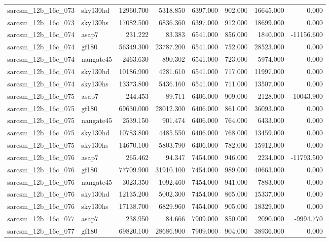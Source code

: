\begin{tabular}{llrrrrrr}
sarcsm\_12b\_16c\_073 & sky130hd & 12960.700 & 5318.850 & 6397.000 & 902.000 & 16645.000 & 0.000 \\
sarcsm\_12b\_16c\_073 & sky130hs & 17082.500 & 6836.360 & 6397.000 & 912.000 & 18699.000 & 0.000 \\
sarcsm\_12b\_16c\_074 & asap7 & 231.222 & 83.383 & 6541.000 & 856.000 & 1840.000 & -11156.600 \\
sarcsm\_12b\_16c\_074 & gf180 & 56349.300 & 23787.200 & 6541.000 & 752.000 & 28523.000 & 0.000 \\
sarcsm\_12b\_16c\_074 & nangate45 & 2463.630 & 890.302 & 6541.000 & 723.000 & 5974.000 & 0.000 \\
sarcsm\_12b\_16c\_074 & sky130hd & 10186.900 & 4281.610 & 6541.000 & 717.000 & 11997.000 & 0.000 \\
sarcsm\_12b\_16c\_074 & sky130hs & 13373.800 & 5436.160 & 6541.000 & 711.000 & 13507.000 & 0.000 \\
sarcsm\_12b\_16c\_075 & asap7 & 244.453 & 89.711 & 6406.000 & 909.000 & 2128.000 & -10043.900 \\
sarcsm\_12b\_16c\_075 & gf180 & 69630.000 & 28012.300 & 6406.000 & 861.000 & 36093.000 & 0.000 \\
sarcsm\_12b\_16c\_075 & nangate45 & 2539.150 & 901.474 & 6406.000 & 764.000 & 6433.000 & 0.000 \\
sarcsm\_12b\_16c\_075 & sky130hd & 10783.800 & 4485.550 & 6406.000 & 768.000 & 13459.000 & 0.000 \\
sarcsm\_12b\_16c\_075 & sky130hs & 14670.100 & 5803.790 & 6406.000 & 782.000 & 15912.000 & 0.000 \\
sarcsm\_12b\_16c\_076 & asap7 & 265.462 & 94.347 & 7454.000 & 946.000 & 2234.000 & -11793.500 \\
sarcsm\_12b\_16c\_076 & gf180 & 77709.900 & 31910.100 & 7454.000 & 989.000 & 40663.000 & 0.000 \\
sarcsm\_12b\_16c\_076 & nangate45 & 3023.350 & 1092.460 & 7454.000 & 941.000 & 7883.000 & 0.000 \\
sarcsm\_12b\_16c\_076 & sky130hd & 12135.200 & 5002.300 & 7454.000 & 865.000 & 15337.000 & 0.000 \\
sarcsm\_12b\_16c\_076 & sky130hs & 17138.700 & 6829.960 & 7454.000 & 905.000 & 18329.000 & 0.000 \\
sarcsm\_12b\_16c\_077 & asap7 & 238.950 & 84.666 & 7909.000 & 850.000 & 2090.000 & -9994.770 \\
sarcsm\_12b\_16c\_077 & gf180 & 69820.100 & 28686.900 & 7909.000 & 904.000 & 38936.000 & 0.000 \\

\end{tabular}
